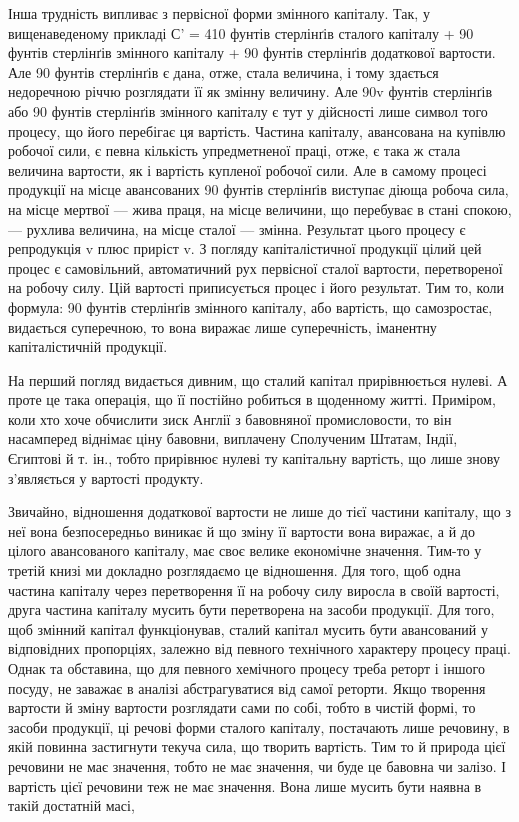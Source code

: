 Інша трудність випливає з первісної форми змінного капіталу.
Так, у вищенаведеному прикладі С' = 410 фунтів стерлінґів сталого
капіталу + 90 фунтів стерлінґів змінного капіталу + 90 фунтів
стерлінґів додаткової вартости. Але 90 фунтів стерлінґів
є дана, отже, стала величина, і тому здається недоречною річчю
розглядати її як змінну величину. Але 90v фунтів стерлінґів або
90 фунтів стерлінґів змінного капіталу є тут у дійсності лише
символ того процесу, що його перебігає ця вартість. Частина
капіталу, авансована на купівлю робочої сили, є певна кількість
упредметненої праці, отже, є така ж стала величина вартости,
як і вартість купленої робочої сили. Але в самому процесі продукції
на місце авансованих 90 фунтів стерлінґів виступає діюща
робоча сила, на місце мертвої — жива праця, на місце величини,
що перебуває в стані спокою, — рухлива величина, на місце сталої
— змінна. Результат цього процесу є репродукція v плюс
приріст v. З погляду капіталістичної продукції цілий цей процес
є самовільний, автоматичний рух первісної сталої вартости,
перетвореної на робочу силу. Цій вартості приписується процес
і його результат. Тим то, коли формула: 90 фунтів стерлінґів
змінного капіталу, або вартість, що самозростає, видається суперечною,
то вона виражає лише суперечність, іманентну капіталістичній
продукції.

На перший погляд видається дивним, що сталий капітал
прирівнюється нулеві. А проте це така операція, що її постійно
робиться в щоденному житті. Приміром, коли хто хоче обчислити
зиск Англії з бавовняної промисловости, то він насамперед віднімає
ціну бавовни, виплачену Сполученим Штатам, Індії, Єгиптові
й т. ін., тобто прирівнює нулеві ту капітальну вартість, що
лише знову з’являється у вартості продукту.

Звичайно, відношення додаткової вартости не лише до тієї
частини капіталу, що з неї вона безпосередньо виникає й що зміну
її вартости вона виражає, а й до цілого авансованого капіталу,
має своє велике економічне значення. Тим-то у третій книзі ми
докладно розглядаємо це відношення. Для того, щоб одна частина
капіталу через перетворення її на робочу силу виросла в своїй
вартості, друга частина капіталу мусить бути перетворена на
засоби продукції. Для того, щоб змінний капітал функціонував,
сталий капітал мусить бути авансований у відповідних пропорціях,
залежно від певного технічного характеру процесу праці.
Однак та обставина, що для певного хемічного процесу треба
реторт і іншого посуду, не заважає в аналізі абстрагуватися від
самої реторти. Якщо творення вартости й зміну вартости розглядати
сами по собі, тобто в чистій формі, то засоби продукції, ці
речові форми сталого капіталу, постачають лише речовину, в
якій повинна застигнути текуча сила, що творить вартість. Тим
то й природа цієї речовини не має значення, тобто не має значення,
чи буде це бавовна чи залізо. І вартість цієї речовини теж не має
значення. Вона лише мусить бути наявна в такій достатній масі,
\parbreak{}  %
